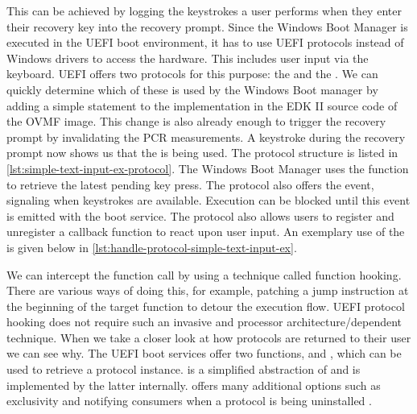 This can be achieved by logging the keystrokes a user performs when they enter their recovery key into the recovery prompt.
Since the Windows Boot Manager is executed in the \ac{UEFI} boot environment, it has to use \ac{UEFI} protocols instead of Windows drivers to access the hardware.
This includes user input via the keyboard.
\ac{UEFI} offers two protocols for this purpose: the  and the .
We can quickly determine which of these is used by the Windows Boot manager by adding a simple  statement to the implementation in the \ac{EDK} II source code of the \ac{OVMF} image.
This change is also already enough to trigger the recovery prompt by invalidating the \ac{PCR} measurements.
A keystroke during the recovery prompt now shows us that the  is being used.
The protocol structure is listed in \autoref{lst:simple-text-input-ex-protocol}.
The Windows Boot Manager uses the  function to retrieve the latest pending key press.
The protocol also offers the  event, signaling when keystrokes are available.
Execution can be blocked until this event is emitted with the  boot service.
The protocol also allows users to register and unregister a callback function to react upon user input.
An exemplary use of the  is given below in \autoref{lst:handle-protocol-simple-text-input-ex}.

\vspace{1em}



We can intercept the  function call by using a technique called function hooking.
There are various ways of doing this, for example, patching a jump instruction at the beginning of the target function to detour the execution flow.
\ac{UEFI} protocol hooking does not require such an invasive and processor architecture\-/dependent technique.
When we take a closer look at how protocols are returned to their user we can see why.
The \ac{UEFI} boot services offer two functions,  and , which can be used to retrieve a protocol instance.
 is a simplified abstraction of  and is implemented by the latter internally.
 offers many additional options such as exclusivity and notifying consumers when a protocol is being uninstalled \cite[Section 7.3]{uefi-spec}.

